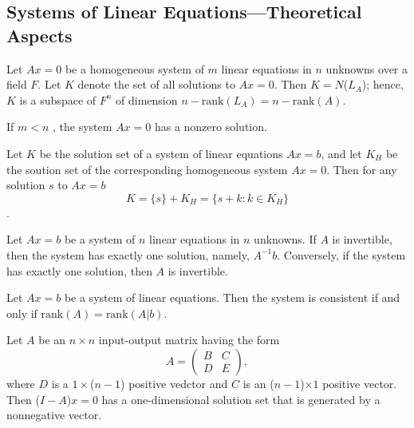 \subsection{Systems of Linear Equations---Theoretical Aspects}
\begin{theorem}
    Let \( Ax = 0 \) be a homogeneous system of \( m \) linear equations in \( n \) unknowns over a field \( F \). Let \( K \) denote the set of all solutions to \( Ax = 0 \). Then \( K =  N\)(\(L_A\));
    hence, \( K \) is a subspace of \( F^n \) of dimension \( n - \text{rank}(L_A) = n - \text{rank}(A) \).
\end{theorem}
\vspace{3cm}
\begin{corollary}
    If \( m < n \) , the system \( Ax = 0 \) has a nonzero solution.
\end{corollary}
\vspace{3cm}
\begin{theorem}
    Let \( K \) be the solution set of a system of linear equations \( Ax = b \), and let \( K_H \) be the soution set of the corresponding homogeneous system \( Ax = 0 \).
    Then for any solution \( s \) to \( Ax = b \) \\
    \[ K = \{s\} + K_H = \{s+k: k \in K_H\} \].
\end{theorem}
\vspace{7cm}
\begin{theorem}
    Let \( Ax = b \) be a system of \( n \) linear equations in \( n \) unknowns. If \( A \) is invertible, then the system has exactly one solution, namely, \( A^{-1}b \).
    Conversely, if the system has exactly one solution, then \( A \) is invertible.
\end{theorem}
\vspace{7cm}
\begin{theorem}
    Let \( Ax = b \) be a system of linear equations. Then the system is consistent if and only if \(\text{rank}(A) = \text{rank}(A|b)\).
\end{theorem}
\vspace{5cm}
\begin{theorem}
    Let \( A \) be an \( n \times n \) input-output matrix having the form
    \[
    A = \begin{pmatrix}
        B & C \\
        D & E
        \end{pmatrix},
    \]
    where \( D \) is a \( 1 \times \)(\(n-1\)) positive vedctor and \( C \) is an (\(n-1\))\(\times 1\) positive vector. Then (\(I - A\))\(x = 0\) has a one-dimensional solution set that is generated by a nonnegative vector.
\end{theorem}
\newpage
